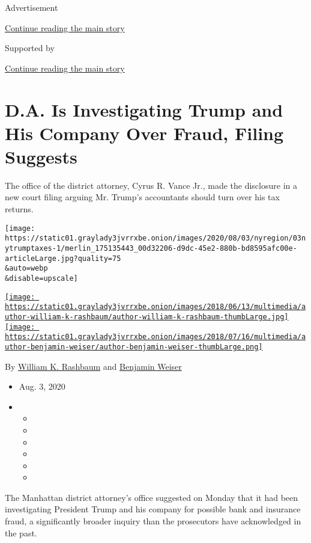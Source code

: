 Advertisement

\protect\hyperlink{after-top}{Continue reading the main story}

Supported by

\protect\hyperlink{after-sponsor}{Continue reading the main story}

\hypertarget{da-is-investigating-trump-and-his-company-over-fraud-filing-suggests}{%
\section{D.A. Is Investigating Trump and His Company Over Fraud, Filing
Suggests}\label{da-is-investigating-trump-and-his-company-over-fraud-filing-suggests}}

The office of the district attorney, Cyrus R. Vance Jr., made the
disclosure in a new court filing arguing Mr. Trump's accountants should
turn over his tax returns.

\texttt{[image: https://static01.graylady3jvrrxbe.onion/images/2020/08/03/nyregion/03nytrumptaxes-1/merlin\_175135443\_00d32206-d9dc-45e2-880b-bd8595afc00e-articleLarge.jpg?quality=75\\\&auto=webp\\\&disable=upscale]}

\href{https://www.nytimes3xbfgragh.onion/by/william-k-rashbaum}{\texttt{[image: https://static01.graylady3jvrrxbe.onion/images/2018/06/13/multimedia/author-william-k-rashbaum/author-william-k-rashbaum-thumbLarge.jpg]}}\href{https://www.nytimes3xbfgragh.onion/by/benjamin-weiser}{\texttt{[image: https://static01.graylady3jvrrxbe.onion/images/2018/07/16/multimedia/author-benjamin-weiser/author-benjamin-weiser-thumbLarge.png]}}

By
\href{https://www.nytimes3xbfgragh.onion/by/william-k-rashbaum}{William
K. Rashbaum} and
\href{https://www.nytimes3xbfgragh.onion/by/benjamin-weiser}{Benjamin
Weiser}

\begin{itemize}
\item
  Aug. 3, 2020
\item
  \begin{itemize}
  \item
  \item
  \item
  \item
  \item
  \item
  \end{itemize}
\end{itemize}

The Manhattan district attorney's office suggested on Monday that it had
been investigating President Trump and his company for possible bank and
insurance fraud, a significantly broader inquiry than the prosecutors
have acknowledged in the past.

